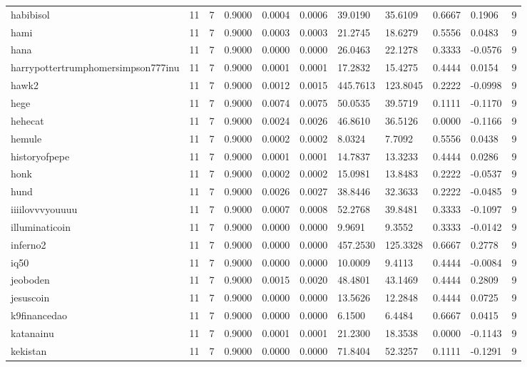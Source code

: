 \begin{table}[htbp]
\begin{tabular}{lllllllllll}
habibisol & 11 & 7 & 0.9000 & 0.0004 & 0.0006 & 39.0190 & 35.6109 & 0.6667 & 0.1906 & 9 \\
hami & 11 & 7 & 0.9000 & 0.0003 & 0.0003 & 21.2745 & 18.6279 & 0.5556 & 0.0483 & 9 \\
hana & 11 & 7 & 0.9000 & 0.0000 & 0.0000 & 26.0463 & 22.1278 & 0.3333 & -0.0576 & 9 \\
harrypottertrumphomersimpson777inu & 11 & 7 & 0.9000 & 0.0001 & 0.0001 & 17.2832 & 15.4275 & 0.4444 & 0.0154 & 9 \\
hawk2 & 11 & 7 & 0.9000 & 0.0012 & 0.0015 & 445.7613 & 123.8045 & 0.2222 & -0.0998 & 9 \\
hege & 11 & 7 & 0.9000 & 0.0074 & 0.0075 & 50.0535 & 39.5719 & 0.1111 & -0.1170 & 9 \\
hehecat & 11 & 7 & 0.9000 & 0.0024 & 0.0026 & 46.8610 & 36.5126 & 0.0000 & -0.1166 & 9 \\
hemule & 11 & 7 & 0.9000 & 0.0002 & 0.0002 & 8.0324 & 7.7092 & 0.5556 & 0.0438 & 9 \\
historyofpepe & 11 & 7 & 0.9000 & 0.0001 & 0.0001 & 14.7837 & 13.3233 & 0.4444 & 0.0286 & 9 \\
honk & 11 & 7 & 0.9000 & 0.0002 & 0.0002 & 15.0981 & 13.8483 & 0.2222 & -0.0537 & 9 \\
hund & 11 & 7 & 0.9000 & 0.0026 & 0.0027 & 38.8446 & 32.3633 & 0.2222 & -0.0485 & 9 \\
iiiilovvvyouuuu & 11 & 7 & 0.9000 & 0.0007 & 0.0008 & 52.2768 & 39.8481 & 0.3333 & -0.1097 & 9 \\
illuminaticoin & 11 & 7 & 0.9000 & 0.0000 & 0.0000 & 9.9691 & 9.3552 & 0.3333 & -0.0142 & 9 \\
inferno2 & 11 & 7 & 0.9000 & 0.0000 & 0.0000 & 457.2530 & 125.3328 & 0.6667 & 0.2778 & 9 \\
iq50 & 11 & 7 & 0.9000 & 0.0000 & 0.0000 & 10.0009 & 9.4113 & 0.4444 & -0.0084 & 9 \\
jeoboden & 11 & 7 & 0.9000 & 0.0015 & 0.0020 & 48.4801 & 43.1469 & 0.4444 & 0.2809 & 9 \\
jesuscoin & 11 & 7 & 0.9000 & 0.0000 & 0.0000 & 13.5626 & 12.2848 & 0.4444 & 0.0725 & 9 \\
k9financedao & 11 & 7 & 0.9000 & 0.0000 & 0.0000 & 6.1500 & 6.4484 & 0.6667 & 0.0415 & 9 \\
katanainu & 11 & 7 & 0.9000 & 0.0001 & 0.0001 & 21.2300 & 18.3538 & 0.0000 & -0.1143 & 9 \\
kekistan & 11 & 7 & 0.9000 & 0.0000 & 0.0000 & 71.8404 & 52.3257 & 0.1111 & -0.1291 & 9 \\

\end{tabular}
\end{table}

